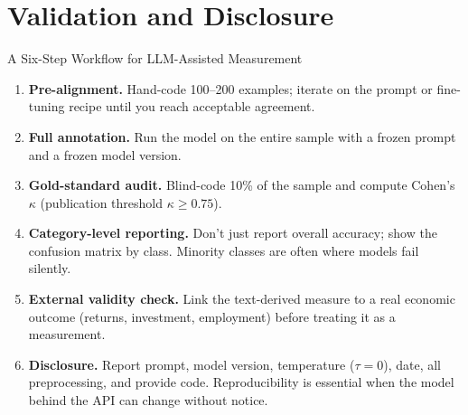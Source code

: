 \section{Validation and Disclosure}

\begin{frame}{A Six-Step Workflow for LLM-Assisted Measurement}
\begin{enumerate}
\item \textbf{Pre-alignment.} Hand-code 100--200 examples; iterate on the prompt or fine-tuning recipe until you reach acceptable agreement.
\medskip
\item \textbf{Full annotation.} Run the model on the entire sample with a frozen prompt and a frozen model version.
\medskip
\item \textbf{Gold-standard audit.} Blind-code 10\% of the sample and compute Cohen's $\kappa$ (publication threshold $\kappa \ge 0.75$).
\medskip
\item \textbf{Category-level reporting.} Don't just report overall accuracy; show the confusion matrix by class. Minority classes are often where models fail silently.
\medskip
\item \textbf{External validity check.} Link the text-derived measure to a real economic outcome (returns, investment, employment) before treating it as a measurement.
\medskip
\item \textbf{Disclosure.} Report prompt, model version, temperature ($\tau = 0$), date, all preprocessing, and provide code. Reproducibility is essential when the model behind the API can change without notice.
\end{enumerate}
\end{frame}

